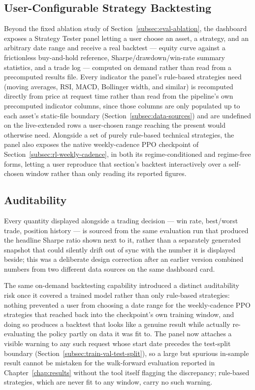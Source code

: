 \subsection{User-Configurable Strategy Backtesting}
\label{subsec:dashboard-strategy-tester}

Beyond the fixed ablation study of Section~\ref{subsec:eval-ablation}, the dashboard exposes a Strategy Tester panel letting a user choose an asset, a strategy, and an arbitrary date range and receive a real backtest --- equity curve against a frictionless buy-and-hold reference, Sharpe/drawdown/win-rate summary statistics, and a trade log --- computed on demand rather than read from a precomputed results file. Every indicator the panel's rule-based strategies need (moving averages, RSI, MACD, Bollinger width, and similar) is recomputed directly from price at request time rather than read from the pipeline's own precomputed indicator columns, since those columns are only populated up to each asset's static-file boundary (Section~\ref{subsec:data-sources}) and are undefined on the live-extended rows a user-chosen range reaching the present would otherwise need. Alongside a set of purely rule-based technical strategies, the panel also exposes the native weekly-cadence PPO checkpoint of Section~\ref{subsec:rl-weekly-cadence}, in both its regime-conditioned and regime-free forms, letting a user reproduce that section's backtest interactively over a self-chosen window rather than only reading its reported figures.

\subsection{Auditability}
\label{subsec:dashboard-auditability}

Every quantity displayed alongside a trading decision --- win rate, best/worst trade, position history --- is sourced from the same evaluation run that produced the headline Sharpe ratio shown next to it, rather than a separately generated snapshot that could silently drift out of sync with the number it is displayed beside; this was a deliberate design correction after an earlier version combined numbers from two different data sources on the same dashboard card.

The same on-demand backtesting capability introduced a distinct auditability risk once it covered a trained model rather than only rule-based strategies: nothing prevented a user from choosing a date range for the weekly-cadence PPO strategies that reached back into the checkpoint's own training window, and doing so produces a backtest that looks like a genuine result while actually re-evaluating the policy partly on data it was fit to. The panel now attaches a visible warning to any such request whose start date precedes the test-split boundary (Section~\ref{subsec:train-val-test-split}), so a large but spurious in-sample result cannot be mistaken for the walk-forward evaluation reported in Chapter~\ref{chap:results} without the tool itself flagging the discrepancy; rule-based strategies, which are never fit to any window, carry no such warning.
